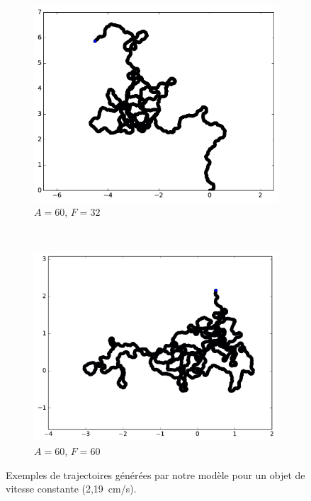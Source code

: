 \begin{appendices}
\begin{figure}[htbp]
\begin{subfigure}[t]{\subImgWmo}
			\includegraphics[width=\textwidth]{figures/ch3/synTraj_219_60_32}
			\caption[$A = 60$, $F=32$]{$A = 60$, $F=32$}
			\label{fig:synTraj_219_60_32}
		\end{subfigure}
		~
		\begin{subfigure}[t]{\subImgWmo}
			\centering
			\includegraphics[width=\textwidth]{figures/ch3/synTraj_219_60_60}
			\caption[$A = 60$, $F=60$]{$A = 60$, $F=60$}
			\label{fig:synTraj_219_60_60}
		\end{subfigure}
		\caption[Mouvements générés par notre modèle -- II]{Exemples de trajectoires générées par notre modèle pour un objet de vitesse constante (2,19~cm/s).}
		\label{fig:motion4560}
	\end{figure}
	

\end{appendices}
